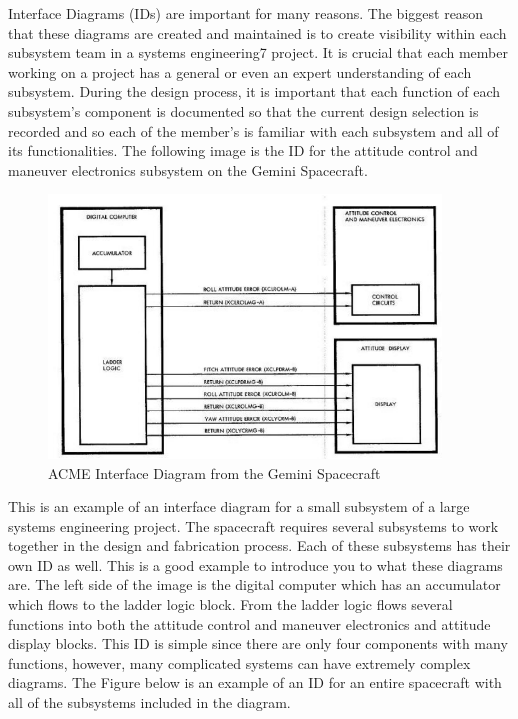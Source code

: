 Interface Diagrams (IDs) are important for many reasons. The biggest
reason that these diagrams are created and maintained is to create
visibility within each subsystem team in a systems engineering7
project. It is crucial that each member working on a project has a
general or even an expert understanding of each subsystem. During the
design process, it is important that each function of each subsystem’s
component is documented so that the current design selection is
recorded and so each of the member’s is familiar with each subsystem
and all of its functionalities. The following image is the ID for the
attitude control and maneuver electronics subsystem on the Gemini Spacecraft.  
\begin{figure}[H]
  \begin{center}
  \includegraphics[height=70mm]{Figures/ACME_ID}
  \end{center}
  \caption{ACME Interface Diagram from the Gemini Spacecraft\cite{qp10}}
\end{figure}
This is an example of an interface diagram for a small subsystem of a
large systems engineering project. The spacecraft requires several
subsystems to work together in the design and fabrication
process. Each of these subsystems has their own ID as well. This is a
good example to introduce you to what these diagrams are. The left
side of the image is the digital computer  which has an accumulator
which flows to the ladder logic block. From the ladder logic flows
several functions into both the attitude control and maneuver
electronics and attitude display blocks. This ID is simple since there
are only four components with many functions, however, many
complicated systems can have extremely complex diagrams. The Figure
below is an example of an ID for an entire spacecraft with all of the 
subsystems included in the diagram.
